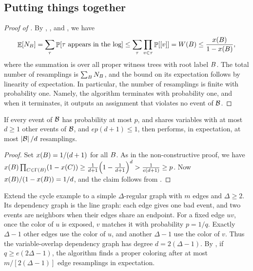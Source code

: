 \subsection{Putting things together}

\begin{proof}[Proof of ]
    By , , and
    , we have
    \begin{equation*}
        \Ex{\NResX{\BEvent}}%
        =%
        \sum_{\WTree} \Prob{ \WTree \text{ appears in the log}}%
        \leq%
        \sum_{\WTree} \prod_{v \in \WTree} \Prob{\LabelX{v}}%
        =%
        \WSum(\BEvent)%
        \leq%
        \frac{x(\BEvent)}{1 - x(\BEvent)},
    \end{equation*}
    where the summation is over all proper witness trees with root
    label ${B}$. The total number of resamplings is
    $\sum_{{B}} N_{{B}}$, and the bound on its
    expectation follows by linearity of expectation. In particular,
    the number of resamplings is finite with probability one. Namely,
    the algorithm terminates with probability one, and when it
    terminates, it outputs an assignment that violates no event of
    $\mathcal{B}$.
\end{proof}

\begin{corollary}
    If every event of $\mathcal{B}$ has probability at most $p$, and
    shares variables with at most $d \geq 1$ other events of
    $\mathcal{B}$, and $e p (d+1) \leq 1$, then \MTAlg performs, in
    expectation, at most $\left| {\mathcal{B}} \right|/d$ resamplings.
\end{corollary}

\begin{proof}
    Set $x({B}) = 1/(d+1)$ for all ${B}$. As in the
    non-constructive proof, we have
    $x(\BEvent) \prod_{\BEventA \in \NbrX{\BEvent}} \pth{1 -
       x(\BEventA)} \geq \frac{1}{d+1}\pth{1 - \frac{1}{d+1}}^d >
    \frac{1}{e(d+1)} \geq p$. Now
    $x(\BEvent)/\pth{1-x(\BEvent)} = 1/d$, and the claim follows from
    .
\end{proof}

\begin{example}
    Extend the cycle example to a simple $\Delta$-regular graph with $m$
    edges and $\Delta\ge 2$. Its dependency graph is the line graph:
    each edge gives one bad event, and two events are neighbors when their
    edges share an endpoint.
    For a fixed edge $uv$, once the color of $u$ is exposed, $v$ matches
    it with probability $p=1/q$. Exactly $\Delta-1$ other edges use the
    color of $u$, and another $\Delta-1$ use the color of $v$. Thus the
    variable-overlap dependency graph has degree $d=2(\Delta-1)$.
    By , if $q\ge e(2\Delta-1)$, the algorithm
    finds a proper coloring after at most $m/[2(\Delta-1)]$ edge
    resamplings in expectation.
\end{example}


